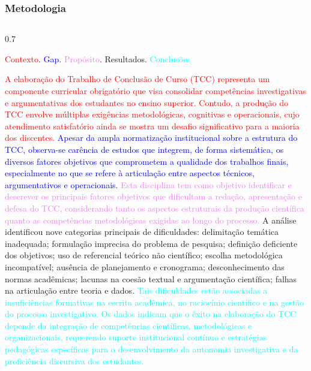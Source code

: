 \documentclass[aspectratio=169,usenames,dvipsnames,compress]{beamer}
\begin{document}
\begin{frame}
\frametitle{Metodologia}

\begin{columns}
\begin{column}{0.7\textwidth}


\begin{tcolorbox}[fit to height=7cm,title={Resumo}]

\textcolor{red}{Contexto}. \textcolor{blue}{Gap}.  \textcolor{violet}{Propósito}.  \textcolor{green!80!black}{Resultados}. \textcolor{cyan}{Conclusões}

\tcbline


\textcolor{red}{A elaboração do Trabalho de Conclusão de Curso (TCC) representa um componente curricular obrigatório que visa consolidar competências investigativas e argumentativas dos estudantes no ensino superior. Contudo, a produção do TCC envolve múltiplas exigências metodológicas, cognitivas e operacionais, cujo atendimento satisfatório ainda se mostra um desafio significativo para a maioria dos discentes.} 
\textcolor{blue}{Apesar da ampla normatização institucional sobre a estrutura do TCC, observa-se carência de estudos que integrem, de forma sistemática, os diversos fatores objetivos que comprometem a qualidade dos trabalhos finais, especialmente no que se refere à articulação entre aspectos técnicos, argumentativos e operacionais.} \textcolor{violet}{Esta disciplina tem como objetivo identificar e descrever os principais fatores objetivos que dificultam a redação, apresentação e defesa do TCC, considerando tanto os aspectos estruturais da produção científica quanto as competências metodológicas exigidas ao longo do processo.} \textcolor{green!50!black}{A análise identificou nove categorias principais de dificuldades: delimitação temática inadequada; formulação imprecisa do problema de pesquisa; definição deficiente dos objetivos; uso de referencial teórico não científico; escolha metodológica incompatível; ausência de planejamento e cronograma; desconhecimento das normas acadêmicas; lacunas na coesão textual e argumentação científica; falhas na articulação entre teoria e dados.} \textcolor{cyan}{Tais dificuldades estão associadas a insuficiências formativas na escrita acadêmica, no raciocínio científico e na gestão do processo investigativo. Os dados indicam que o êxito na elaboração do TCC depende da integração de competências científicas, metodológicas e organizacionais, requerendo suporte institucional contínuo e estratégias pedagógicas específicas para o desenvolvimento da autonomia investigativa e da proficiência discursiva dos estudantes.}
\end{tcolorbox}
\end{column}
\end{columns}
\end{frame}
\end{document}
